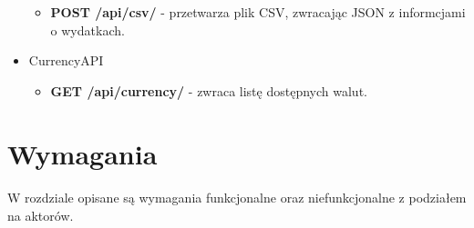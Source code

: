 \documentclass{article}
\begin{document}
\begin{itemize}
\begin{itemize}
				\item \textbf{POST /api/csv/} - przetwarza plik CSV, zwracając JSON z informcjami o wydatkach.
			\end{itemize}
		\item CurrencyAPI
			\begin{itemize}
				\item \textbf{GET /api/currency/} - zwraca listę dostępnych walut.
			\end{itemize}



	\end{itemize}
	\section{Wymagania}
	\paragraph{} W rozdziale opisane są wymagania funkcjonalne oraz niefunkcjonalne z podziałem na aktorów.
\end{document}
